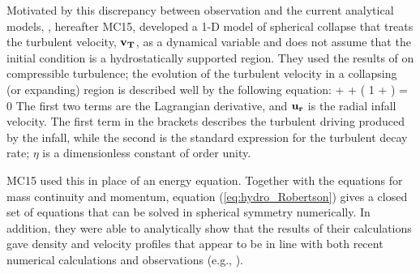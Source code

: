 \documentclass[../dissertation.tex]{subfiles}
\begin{document}
Motivated by this discrepancy between observation and the current analytical models,
\citet{2015ApJ...804...44M}, hereafter MC15, developed a 1-D model of
spherical collapse that treats the turbulent velocity, $\mathbf{v_T}$, as a dynamical variable and
does not assume that the initial condition is a hydrostatically supported region. 
They used the results of \citet{2012ApJ...750L..31R} on compressible turbulence; the evolution 
of the turbulent velocity in a collapsing (or expanding) region is described well by the following equation:
%
\be
{} + \ur {} 
+ \left( 1 + \eta \frac{\vt}{\ur} \right)  = 0
\label{eq:hydro_Robertson}
\ee
%
The first two terms are the Lagrangian derivative, and $\mathbf{u_r}$ is the radial infall velocity. The first term in the brackets 
describes the turbulent driving produced by the infall, while the second 
is the standard expression for the turbulent decay rate;  $\eta$ is a dimensionless constant of order unity.

MC15 used this in place of an energy equation. Together with the
equations for mass continuity and momentum, equation (\ref{eq:hydro_Robertson}) gives a
closed set of equations that can be solved in spherical symmetry
numerically. In addition, they were able to analytically show that the
results of their calculations gave density and velocity profiles that
appear to be in line with both recent numerical calculations
\citep{2015ApJ...800...49L} and observations (e.g.,
\citealt{1995ApJ...446..665C,1997ApJ...476..730P}).
\end{document}
